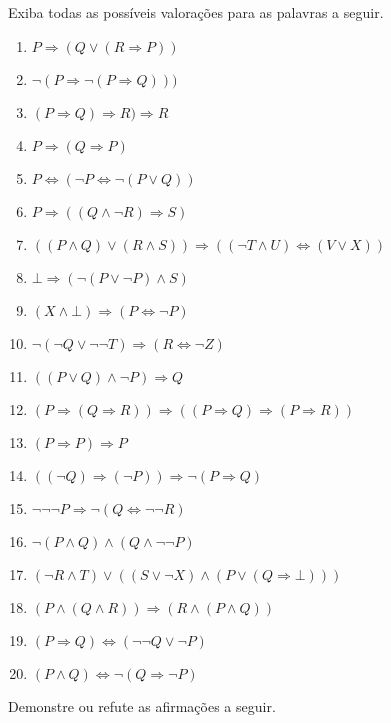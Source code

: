 \begin{exercise}\label{exerc:LPro5}
    Exiba todas as possíveis valorações para as palavras a seguir.
\end{exercise}

\begin{enumerate}
    \item $P \Rightarrow (Q \lor (R \Rightarrow P))$
    \item $\neg (P \Rightarrow \neg (P \Rightarrow Q)))$
    \item $(P \Rightarrow Q) \Rightarrow R) \Rightarrow R$
    \item $P \Rightarrow (Q \Rightarrow P)$
    \item $P \Leftrightarrow (\neg P \Leftrightarrow \neg (P \lor Q))$
    \item $P \Rightarrow ((Q \land \neg R) \Rightarrow S)$
    \item $((P \land Q) \lor (R \land S)) \Rightarrow ((\neg T \land U) \Leftrightarrow (V \lor X))$
    \item $\bot \Rightarrow (\neg (P \lor \neg P) \land S)$
    \item $(X \land \bot) \Rightarrow (P \Leftrightarrow \neg P)$
    \item $\neg(\neg Q \lor \neg \neg T) \Rightarrow (R \Leftrightarrow \neg Z)$
    \item $((P \lor Q) \land \neg P) \Rightarrow Q$
    \item $(P \Rightarrow (Q \Rightarrow R)) \Rightarrow ((P \Rightarrow Q) \Rightarrow (P \Rightarrow R))$
    \item $(P \Rightarrow P) \Rightarrow P$
    \item $((\neg Q) \Rightarrow (\neg P)) \Rightarrow \neg (P \Rightarrow Q)$
    \item $\neg \neg \neg P \Rightarrow \neg (Q \Leftrightarrow \neg \neg R)$
    \item $\neg (P \land Q) \land (Q \land \neg \neg P)$
    \item $(\neg R \land T) \lor ((S \lor \neg X)\land(P \lor (Q \Rightarrow \bot)))$
    \item $(P \land (Q \land R)) \Rightarrow (R \land (P \land Q))$
    \item $(P \Rightarrow Q) \Leftrightarrow (\neg \neg Q \lor \neg P)$
    \item $(P \land Q) \Leftrightarrow \neg (Q \Rightarrow \neg P)$
\end{enumerate}

\begin{exercise}\label{exerc:LPro6}
    Demonstre ou refute as afirmações a seguir.
\end{exercise}


